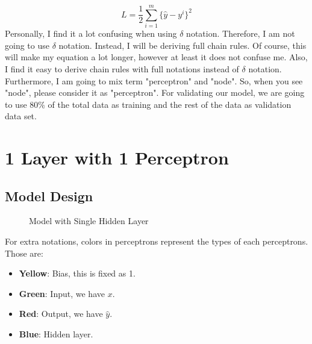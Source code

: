 \documentclass{homework}
\begin{document}
\[
    L = \frac{1}{2}\sum_{i=1}^{m}\{\hat{y} - y^i\}^2
\]
Personally, I find it a lot confusing when using $\delta$ notation. Therefore, I am not going to use $\delta$ notation. Instead, I will be deriving full chain rules. Of course, this will make my equation a lot longer, however at least it does not confuse me. Also, I find it easy to derive chain rules with full notations instead of $\delta$ notation. Furthermore, I am going to mix term "perceptron" and "node". So, when you see "node", please consider it as "perceptron". For validating our model, we are going to use 80\% of the total data as training and the rest of the data as validation data set.

\pagebreak

\section{1 Layer with 1 Perceptron}
\subsection{Model Design}

\begin{figure}[h]
    \centering
    \caption{Model with Single Hidden Layer}
    \label{fig:my_label}
\end{figure}

For extra notations, colors in perceptrons represent the types of each perceptrons. Those are:
\begin{itemize}
    \item \textbf{Yellow}: Bias, this is fixed as 1.
    \item \textbf{Green}: Input, we have $x$.
    \item \textbf{Red}: Output, we have $\hat{y}$.
    \item \textbf{Blue}: Hidden layer.
\end{itemize}
\end{document}
